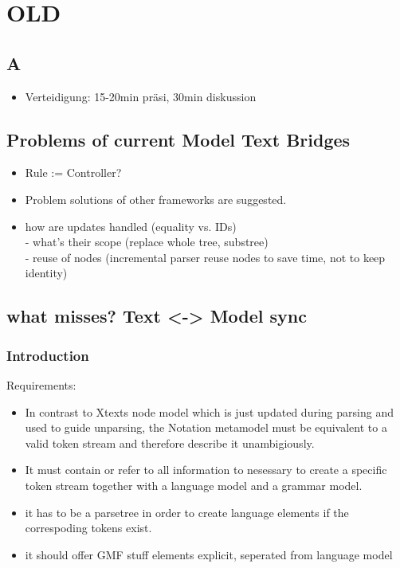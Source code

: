 \chapter{OLD}
\section{A}
\begin{itemize}
	\item Verteidigung: 15-20min präsi, 30min diskussion
\end{itemize}
	

\section{Problems of current Model Text Bridges}
\begin{itemize}
	\item Rule := Controller?
	\item Problem solutions of other frameworks are suggested.
\item how are updates handled (equality vs. IDs) \\
		- what's their scope (replace whole tree, substree) \\
		-	reuse of nodes (incremental parser reuse nodes to save time, not to keep identity)
\end{itemize}	



\section{what misses? Text <-> Model sync}





\subsection{Introduction}
Requirements:
\begin{itemize}
	\item In contrast to Xtexts node model which is just updated during parsing and used to guide unparsing, the Notation metamodel must be equivalent to a valid token stream and therefore describe it unambigiously. 
	\item It must contain or refer to all information to nesessary to create a specific token stream together with a language model and a grammar model.   
	\item it has to be a parsetree in order to create language elements if the correspoding tokens exist.
	\item it should offer GMF stuff elements 
	explicit, seperated from language model
\end{itemize}




